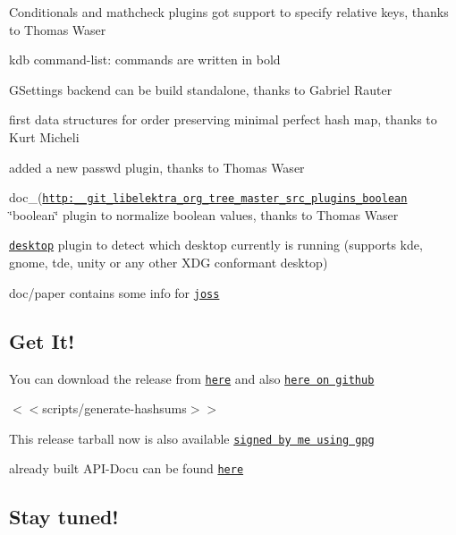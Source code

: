 \begin{DoxyItemize}
\item Conditionals and mathcheck plugins got support to specify relative keys, thanks to Thomas Waser
\item {\ttfamily kdb} command-\/list\+: commands are written in bold
\item G\+Settings backend can be build standalone, thanks to Gabriel Rauter
\item first data structures for order preserving minimal perfect hash map, thanks to Kurt Micheli
\item added a new passwd plugin, thanks to Thomas Waser
\item doc\+\_\+(\href{http:__git_libelektra_org_tree_master_src_plugins_boolean}{\tt http\+:\+\_\+\+\_\+git\+\_\+libelektra\+\_\+org\+\_\+tree\+\_\+master\+\_\+src\+\_\+plugins\+\_\+boolean} \char`\"{}boolean\char`\"{} plugin to normalize boolean values, thanks to Thomas Waser
\item \href{http://git.libelektra.org/tree/master/src/plugins/desktop}{\tt desktop} plugin to detect which desktop currently is running (supports kde, gnome, tde, unity or any other X\+D\+G conformant desktop)
\item {\ttfamily doc/paper} contains some info for \href{https://github.com/openjournals/joss}{\tt joss}
\end{DoxyItemize}

\subsection*{Get It!}

You can download the release from \href{http://www.libelektra.org/ftp/elektra/releases/elektra-0.8.18.tar.gz}{\tt here} and also \href{https://github.com/ElektraInitiative/ftp/tree/master/releases/elektra-0.8.18.tar.gz}{\tt here on github}

$<$$<${\ttfamily scripts/generate-\/hashsums}$>$$>$

This release tarball now is also available \href{http://www.libelektra.org/ftp/elektra/releases/elektra-0.8.18.tar.gz.gpg}{\tt signed by me using gpg}

already built A\+P\+I-\/\+Docu can be found \href{http://doc.libelektra.org/api/0.8.18/html/}{\tt here}

\subsection*{Stay tuned!}

